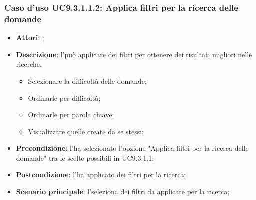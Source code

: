 		 \subsubsection{Caso d'uso UC9.3.1.1.2: Applica filtri per la ricerca delle domande}
		 \label{UC9.3.1.1.2}
		 \begin{itemize}
		 	\item \textbf{Attori}: \uaupro;
		 	\item \textbf{Descrizione}: l'\uaupro può applicare dei filtri per ottenere dei risultati migliori nelle ricerche. 
			 	\begin{itemize}
					\item Selezionare la difficoltà delle domande;
					\item Ordinarle per difficoltà;
					\item Ordinarle per parola chiave;
					\item Visualizzare quelle create da se stessi;
			 	\end{itemize}
		 	\item \textbf{Precondizione}: l'\uaupro ha selezionato l'opzione "Applica filtri per la ricerca delle domande" tra le scelte possibili in UC9.3.1.1;
		 	\item \textbf{Postcondizione}: l'\uaupro ha applicato dei filtri per la ricerca; 
		 	\item \textbf{Scenario principale}: l'\uaupro seleziona dei filtri da applicare per la ricerca;
		 \end{itemize}
		 
